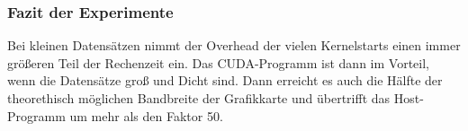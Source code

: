 \documentclass[ngerman]{scrartcl}
\begin{document}


\subsubsection{Fazit der Experimente}
Bei kleinen Datensätzen nimmt der Overhead der vielen Kernelstarts einen immer größeren Teil der Rechenzeit ein.
Das CUDA-Programm ist dann im Vorteil, wenn die Datensätze groß und Dicht sind. 
Dann erreicht es auch die Hälfte der theorethisch möglichen Bandbreite der Grafikkarte und übertrifft das Host-Programm um mehr als den Faktor 50.
\clearpage

\nocite{introductiontosvm}
\nocite{diplomarbeit}
\nocite{libsvm}
\nocite{cudaprogrammingguide}


{}

\end{document}
